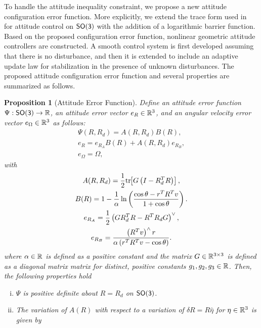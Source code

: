 \documentclass[10pt,fleqn]{IJCAS}  %
\newtheorem{prop}{Proposition}
\begin{document}
\begin{multicols}{2}
To handle the attitude inequality constraint, we propose a new attitude configuration error function. 
More explicitly, we extend the trace form used in~\cite{bullo2004,LeeITCST13} for attitude control on \(\mathsf{SO(3)}\) with the addition of a logarithmic barrier function. 
Based on the proposed configuration error function,  nonlinear geometric attitude controllers are constructed. 
A smooth control system is first developed assuming that there is  no disturbance, and then it is extended to include an adaptive update law for stabilization in the presence of unknown disturbances. 
The proposed attitude configuration error function and several properties are summarized as follows.

\begin{prop}[Attitude Error Function] \label{prop:config_error}
Define an attitude error function \( \Psi : \mathsf{SO(3)} \to \mathbb{R} \), an attitude error vector \( e_R \in \mathbb{R}^3 \), and an angular velocity error vector \( e_\Omega \in \mathbb{R}^3 \) as follows:
\begin{gather}
	\Psi(R, R_d) = A(R, R_d) B(R) , \label{eqn:psi} \\
	e_R = e_{R_A} B(R) + A(R,R_d) e_{R_B} , \label{eqn:eR} \\
	e_\Omega = \Omega , \label{eqn:eW}
\end{gather}
with
\begin{gather}
	A(R,R_d) = \frac{1}{2} \mathrm{tr}\negthickspace\left[ G \left( I - R_d^T R\right) \right] , \label{eqn:A} \\
	B(R) = 1 - \frac{1}{\alpha} \ln \left( \frac{\cos \theta -  r^T R^T v}{1 + \cos \theta}\right) . \label{eqn:B} \\
	e_{R_A} = \frac{1}{2} \left( G R_d^T R - R^T R_d G \right) ^ \vee , \label{eqn:eRA} \\
	e_{R_B} = \frac{ \left( R^T v\right)^\wedge r}{\alpha \left(r^T R^T v - \cos \theta \right)} . \label{eqn:eRB} 
\end{gather}	
where \( \alpha \in \mathbb{R} \) is defined as a positive constant and the matrix \( G \in \mathbb{R}^{3 \times 3} \) is defined as a diagonal matrix matrix for distinct, positive constants \( g_1, g_2, g_3 \in \mathbb{R} \).
Then, the following properties hold
\begin{enumerate}[(i)]
	\item \label{item:prop_psi_psd} \(\Psi\) is positive definite about \( R = R_d\) on $\mathsf{SO(3)}$.
	\item \label{item:prop_era}The variation of \( A(R) \) with respect to a variation of \( \delta R = R \hat{\eta} \) for \( \eta \in \mathbb{R}^3 \) is given by

\end{enumerate}
\end{prop}
\end{multicols}
\end{document}
